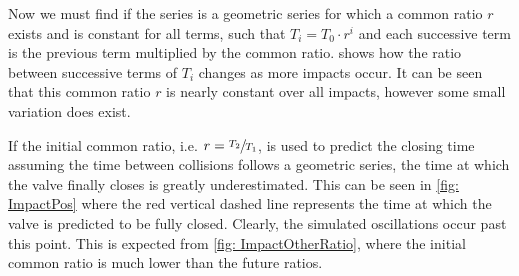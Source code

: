 Now we must find if the series is a geometric series for which a common ratio $r$ exists and is constant for all terms, such that $T_i = T_0 \cdot r^i$ and each successive term is the previous term multiplied by the common ratio.  shows how the ratio between successive terms of $T_i$ changes as more impacts occur. It can be seen that this common ratio $r$ is nearly constant over all impacts, however some small variation does exist.

If the initial common ratio, i.e. $r = \sfrac{T_2}{T_1}$, is used to predict the closing time assuming the time between collisions follows a geometric series, the time at which the valve finally closes is greatly underestimated. This can be seen in \cref{fig: ImpactPos} where the red vertical dashed line represents the time at which the valve is predicted to be fully closed. Clearly, the simulated oscillations occur past this point. This is expected from \cref{fig: ImpactOtherRatio}, where the initial common ratio is much lower than the future ratios.
~
